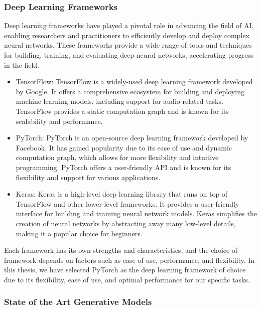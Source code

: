 \begin{frame}
    \frametitle{Deep Learning Frameworks}
    
    Deep learning frameworks have played a pivotal role in advancing the field of AI, enabling researchers and practitioners to efficiently develop and deploy complex neural networks. These frameworks provide a wide range of tools and techniques for building, training, and evaluating deep neural networks, accelerating progress in the field.

    \begin{itemize}
        \item TensorFlow: TensorFlow is a widely-used deep learning framework developed by Google. It offers a comprehensive ecosystem for building and deploying machine learning models, including support for audio-related tasks. TensorFlow provides a static computation graph and is known for its scalability and performance.

        \item PyTorch: PyTorch is an open-source deep learning framework developed by Facebook. It has gained popularity due to its ease of use and dynamic computation graph, which allows for more flexibility and intuitive programming. PyTorch offers a user-friendly API and is known for its flexibility and support for various applications.

        \item Keras: Keras is a high-level deep learning library that runs on top of TensorFlow and other lower-level frameworks. It provides a user-friendly interface for building and training neural network models. Keras simplifies the creation of neural networks by abstracting away many low-level details, making it a popular choice for beginners.

    \end{itemize}

    Each framework has its own strengths and characteristics, and the choice of framework depends on factors such as ease of use, performance, and flexibility. In this thesis, we have selected PyTorch as the deep learning framework of choice due to its flexibility, ease of use, and optimal performance for our specific tasks.

\end{frame}


\begin{frame}
    \frametitle{State of the Art Generative Models}
\end{frame}


